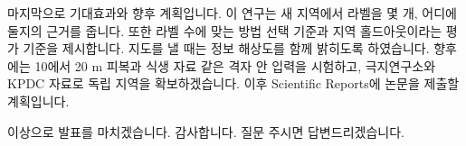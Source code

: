 
마지막으로 기대효과와 향후 계획입니다. 이 연구는 새 지역에서 라벨을 몇 개, 어디에 둘지의 근거를 줍니다. 또한 라벨 수에 맞는 방법 선택 기준과 지역 홀드아웃이라는 평가 기준을 제시합니다. 지도를 낼 때는 정보 해상도를 함께 밝히도록 하였습니다. 향후에는 10에서 20 m 피복과 식생 자료 같은 격자 안 입력을 시험하고, 극지연구소와 KPDC 자료로 독립 지역을 확보하겠습니다. 이후 Scientific Reports에 논문을 제출할 계획입니다.



이상으로 발표를 마치겠습니다. 감사합니다. 질문 주시면 답변드리겠습니다.

